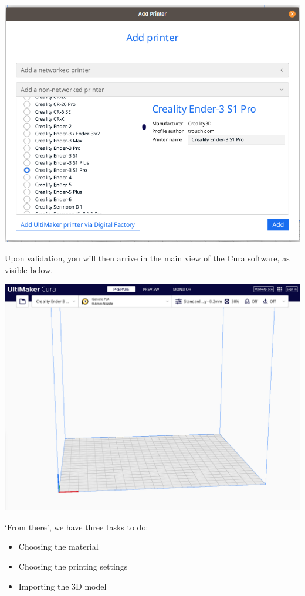\documentclass[a4paper,11pt]{article}
\begin{document}
\begin{center}
\includegraphics[width=.95\linewidth]{img/cura/2.png}
\end{center}

Upon validation, you will then arrive in the main view of the Cura software, as visible below.

\begin{center}
\includegraphics[width=.95\linewidth]{img/cura/3.png}
\end{center}

`From there', we have three tasks to do:
\begin{itemize}
\item Choosing the material
\item Choosing the printing settings
\item Importing the 3D model
\end{itemize}
\end{document}
